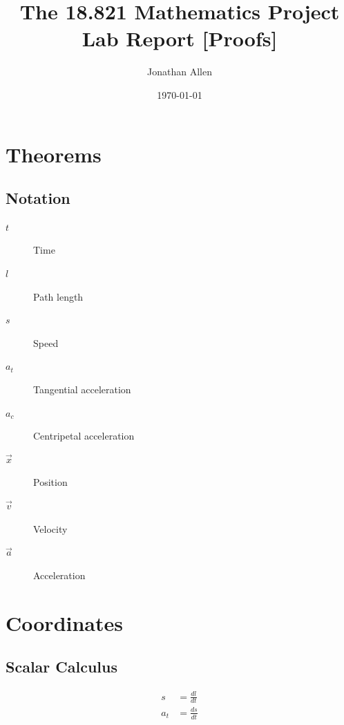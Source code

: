 \documentclass[12pt]{amsart}   %
\begin{document}
\title[The 18.821 report]{The 18.821 Mathematics Project Lab Report 
[Proofs]} 
 
\author{Jonathan Allen}
\date{\today}              %


\newcommand{\C}{\mathbb C} %
\newcommand{\R}{\mathbb R} 
\newcommand{\Z}{\mathbb Z}
\newcommand{\Q}{\mathbb Q}
\newcommand{\N}{\mathbb N}

\maketitle

\section{Theorems}

\subsection{Notation\label{sec:notation}} 

\begin{description}
    \item[$t$] Time
    \item[$l$] Path length
    \item[$s$] Speed
    \item[$a_t$] Tangential acceleration
    \item[$a_c$] Centripetal acceleration
    \item[$\vec{x}$] Position
    \item[$\vec{v}$] Velocity
    \item[$\vec{a}$] Acceleration
\end{description}

\section{Coordinates}

\subsection{Scalar Calculus}

\begin{align}
s& = \frac{dl}{dt}\\
%
a_t& = \frac{ds}{dt}\\
\end{align}
\end{document}
